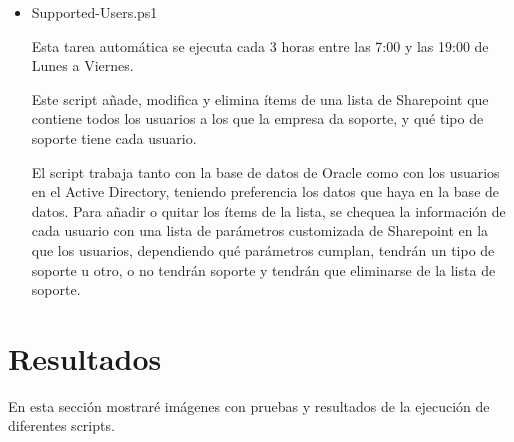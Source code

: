\documentclass[a4paper, 12pt]{book}
\begin{document}
\begin{itemize}
\item Supported-Users.ps1

Esta tarea automática se ejecuta cada 3 horas entre las 7:00 y las 19:00 de Lunes a Viernes.

Este script añade, modifica y elimina ítems de una lista de Sharepoint que contiene todos los usuarios a los que la empresa da soporte, y qué tipo de soporte tiene cada usuario.

El script trabaja tanto con la base de datos de Oracle como con los usuarios en el Active Directory, teniendo preferencia los datos que haya en la base de datos. Para añadir o quitar los ítems de la lista, se chequea la información de cada usuario con una lista de parámetros customizada de Sharepoint en la que los usuarios, dependiendo qué parámetros cumplan, tendrán un tipo de soporte u otro, o no tendrán soporte y tendrán que eliminarse de la lista de soporte.
\end{itemize}



\cleardoublepage
\chapter{Resultados}
\label{chap:Experimentos, validación y resultados}

En esta sección mostraré imágenes con pruebas y resultados de la ejecución de diferentes scripts.
\end{document}
